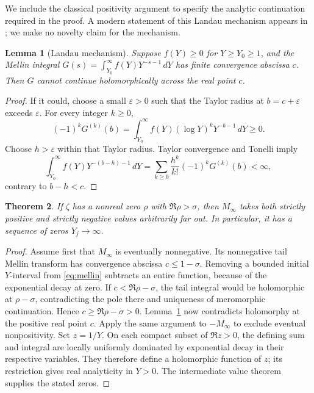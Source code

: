 \documentclass[11pt,a4paper]{article}
\newtheorem{theorem}{Theorem}[section]
\newtheorem{lemma}[theorem]{Lemma}
\theoremstyle{definition}
\theoremstyle{remark}
\newcommand{\dd}{\,d}
\begin{document}
We include the classical positivity argument to specify the analytic
continuation required in the proof. A modern statement of this
Landau mechanism appears in \cite[Theorem 3.1]{MM}; we make no
novelty claim for the mechanism.
\begin{lemma}[Landau mechanism]\label{lem:landau}
Suppose \(f(Y)\ge0\) for \(Y\ge Y_0\ge1\), and the Mellin integral
\(G(s)=\int_{Y_0}^\infty f(Y)Y^{-s-1}\dd Y\) has finite convergence
abscissa \(c\). Then \(G\) cannot continue holomorphically across
the real point \(c\).
\end{lemma}
\begin{proof}
If it could, choose a small \(\varepsilon>0\) such that the Taylor
radius at \(b=c+\varepsilon\) exceeds \(\varepsilon\).
For every integer \(k\ge0\),
\[
 (-1)^kG^{(k)}(b)
 =\int_{Y_0}^\infty f(Y)(\log Y)^kY^{-b-1}\dd Y\ge0.
\]
Choose \(h>\varepsilon\) within that Taylor radius. Taylor convergence
and Tonelli imply
\[
 \int_{Y_0}^\infty f(Y)Y^{-(b-h)-1}\dd Y
 =\sum_{k\ge0}\frac{h^k}{k!}(-1)^kG^{(k)}(b)<\infty,
\]
contrary to \(b-h<c\).
\end{proof}

\begin{theorem}\label{thm:oscillation}
If \(\zeta\) has a nonreal zero \(\rho\) with \(\Re\rho>\sigma\),
then \(M_\infty\) takes both strictly positive and strictly negative
values arbitrarily far out. In particular, it has a sequence of
zeros \(Y_j\to\infty\).
\end{theorem}
\begin{proof}
Assume first that \(M_\infty\) is eventually nonnegative.
Its nonnegative tail Mellin transform has convergence abscissa
\(c\le1-\sigma\). Removing a bounded initial \(Y\)-interval from
\eqref{eq:mellin} subtracts an entire function, because of the
exponential decay at zero. If \(c<\Re\rho-\sigma\), the tail
integral would be holomorphic at \(\rho-\sigma\), contradicting
the pole there and uniqueness of meromorphic continuation.
Hence \(c\ge\Re\rho-\sigma>0\).
Lemma~\ref{lem:landau} now contradicts holomorphy at the positive
real point \(c\). Apply the same argument to \(-M_\infty\) to
exclude eventual nonpositivity.
Set \(z=1/Y\). On each compact subset of \(\Re z>0\), the defining
sum and integral are locally uniformly dominated by exponential
decay in their respective variables. They therefore define a
holomorphic function of \(z\); its restriction gives real analyticity
in \(Y>0\). The intermediate
value theorem supplies the stated zeros.
\end{proof}
\end{document}
